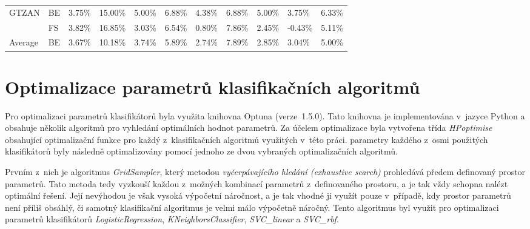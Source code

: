 \begin{table}[H]
{\begin{tabular}{lllllllllll}
    \multirow{-2}{*}{GTZAN}   & \multicolumn{1}{l|}{\cellcolor[HTML]{EFEFEF}BE} & \cellcolor[HTML]{EFEFEF}3.75\% & \cellcolor[HTML]{EFEFEF}15.00\% & \cellcolor[HTML]{EFEFEF}5.00\% & \cellcolor[HTML]{EFEFEF}6.88\% & \cellcolor[HTML]{EFEFEF}4.38\% & \cellcolor[HTML]{EFEFEF}6.88\%  & \cellcolor[HTML]{EFEFEF}5.00\% & \cellcolor[HTML]{EFEFEF}3.75\% & \cellcolor[HTML]{EFEFEF}6.33\% \\ \cline{1-2}
                              & \multicolumn{1}{l|}{FS}                         & 3.82\%                         & 16.85\%                         & 3.03\%                         & 6.54\%                         & 0.80\%                         & 7.86\%                          & 2.45\%                         & -0.43\%                        & 5.11\%                         \\
    \multirow{-2}{*}{Average} & \multicolumn{1}{l|}{\cellcolor[HTML]{EFEFEF}BE} & \cellcolor[HTML]{EFEFEF}3.67\% & \cellcolor[HTML]{EFEFEF}10.18\% & \cellcolor[HTML]{EFEFEF}3.74\% & \cellcolor[HTML]{EFEFEF}5.89\% & \cellcolor[HTML]{EFEFEF}2.74\% & \cellcolor[HTML]{EFEFEF}7.89\%  & \cellcolor[HTML]{EFEFEF}2.85\% & \cellcolor[HTML]{EFEFEF}3.04\% & \cellcolor[HTML]{EFEFEF}5.00\%
    \end{tabular}}
\end{table}

\section{Optimalizace parametrů klasifikačních algoritmů}
\label{NIS_optimalizace_paramteru_klasifikacnich_algoritmu}
Pro optimalizaci parametrů klasifikátorů byla využita knihovna Optuna (verze~1.5.0). Tato knihovna je implementována v~jazyce Python a obsahuje několik algoritmů pro vyhledání optimálních hodnot parametrů. Za účelem optimalizace byla vytvořena třída \textit{HPoptimise} obsahující optimalizační funkce pro každý z~klasifikačních algoritmů využitých v~této práci. parametry každého z~osmi použitých klasifikátorů byly následně optimalizovány pomocí jednoho ze dvou vybraných optimalizačních algoritmů.

Prvním z~nich je algoritmus \textit{GridSampler}, který metodou \textit{vyčerpávajícího hledání (exhaustive search)} prohledává předem definovaný prostor parametrů. Tato metoda tedy vyzkouší každou z~možných kombinací parametrů z~definovaného prostoru, a je tak vždy schopna nalézt optimální řešení. Její nevýhodou je však vysoká výpočetní náročnost, a je tak vhodné ji využít pouze v~případě, kdy prostor parametrů není příliš obsáhlý, či samotný klasifikační algoritmus je velmi málo výpočetně náročný. Tento algoritmus byl využit pro optimalizaci parametrů klasifikátorů \textit{LogisticRegression}, \textit{KNeighborsClassifier}, \textit{SVC\_linear} a \textit{SVC\_rbf}.

